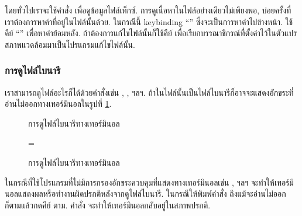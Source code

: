 \begin{thwbr}
โดยทั่วไปเราจะใช้คำสั่ง  เพื่อดูข้อมูลไฟล์เท็กซ์. การดูเนื้อหาในไฟล์อย่างเดียวไม่เพียงพอ, บ่อยครั้งที่เราต้องการหาคำที่อยู่ในไฟล์นั้นด้วย. ในกรณีนี้ keybinding ``\cmd{/}'' ซึ่งจะเป็นการหาคำไปข้างหน้า. ใช้คีย์ ``'' เพื่อหาคำย้อมหลัง. ถ้าต้องการแก้ไขไฟล์นั้นก็ใช้คีย์  เพื่อเรียกบรรณาธิกรณ์ที่ตั้งค่าไว้ในตัวแปรสภาพแวดล้อมมาเป็นโปรแกรมแก้ไขไฟล์นั้น.

\subsubsection{การดูไฟล์ไบนารี}

เราสามารถดูไฟล์อะไรก็ได้ด้วยคำสั่งเช่น , , %
ฯลฯ. ถ้าในไฟล์นั้นเป็นไฟล์ไบนารีก็อาจจะแสดงอักขระที่อ่านไม่ออกทางเทอร์มินอลในรูปที่ \ref{fig:binfile}.

\begin{figure}[!htb]
\ifthenelse{\isodd{\pageref{fig:binfile}}}%
{\parbox{\headwidth}{\center{}\caption{การดูไฟล์ไบนารีทางเทอร์มินอล}\label{fig:binfile}}}%
{\leftskip=\moveback\parbox{\headwidth}{\center{}\caption{การดูไฟล์ไบนารีทางเทอร์มินอล}\label{fig:binfile}}}
\end{figure}
ในกรณีที่ใช้โปรแกรมที่ไม่มีการกรองอักขระควบคุมที่แสดงทางเทอร์มินอลเช่น ,  ฯลฯ จะทำให้เทอร์มินอลแสดงผลหรือทำงานผิดปรกติหลังจากดูไฟล์ไบนารี. ในกรณีให้พิมพ์คำสั่ง  ถึงแม้จะอ่านไม่ออกก็ตามแล้วกดคีย์  ตาม. คำสั่ง  จะทำให้เทอร์มินอลกลับอยู่ในสภาพปรกติ.


\end{thwbr}
